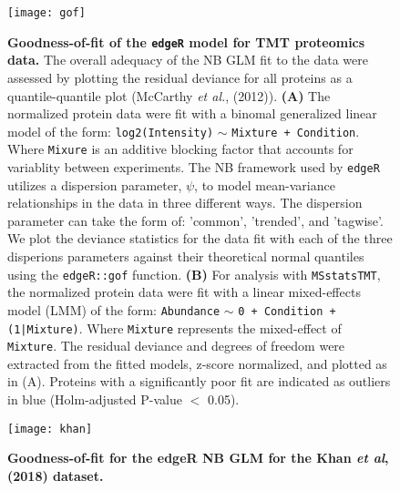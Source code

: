 

\begin{figure}[h] %
	\begin{fullwidth}
		\begin{center}
		\texttt{[image: gof]}
		\caption{\textbf{Goodness-of-fit of the \texttt{edgeR} model for
		TMT proteomics data.} The overall
		adequacy of the NB GLM fit to the data were assessed 
		by plotting the residual deviance for all proteins as a 
		quantile-quantile plot (McCarthy \textit{et al.}, (2012)). 
		\textbf{(A)} The normalized protein data were fit with a 
		binomal generalized linear model of the form: 
		\texttt{log2(Intensity)} $\sim$ \texttt{Mixture + Condition}.
		Where \texttt{Mixure} is an additive blocking factor that 
		accounts for variablity between experiments.  The NB framework
		used by \texttt{edgeR} utilizes a dispersion parameter,
		$\psi$, to model mean-variance relationships in the data
		in three different ways.
		The dispersion parameter can take the form of: 'common', 'trended', and 'tagwise'. 
		We plot the deviance
		statistics for the data fit with each of
		the three disperions parameters against their 
		theoretical normal quantiles using the \texttt{edgeR::gof}
		function. \textbf{(B)} For analysis with \texttt{MSstatsTMT},
		the normalized protein data were fit with a linear mixed-effects 
		model (LMM) of the form: 
		\texttt{Abundance} $\sim$ \texttt{0 + Condition + (1|Mixture)}. 
		Where \texttt{Mixture} represents the mixed-effect
		of \texttt{Mixture}. The residual deviance and degrees of 
		freedom were extracted from the fitted models, z-score
		normalized, and plotted as in (A). Proteins with a significantly 
		poor fit are indicated as outliers in blue 
		(Holm-adjusted P-value $<$ 0.05).}
		\label{fig:gof}
	\end{center}
	\end{fullwidth}
\end{figure}

\newpage

\begin{figure}[h] %
  \begin{fullwidth}
  \begin{center}
	  \texttt{[image: khan]}
	  \caption{\textbf{Goodness-of-fit for the edgeR NB GLM for the Khan
	  \textit{et al}, (2018) dataset.} } %
	  \label{fig:khan}
  \end{center}
  \end{fullwidth}
\end{figure}

